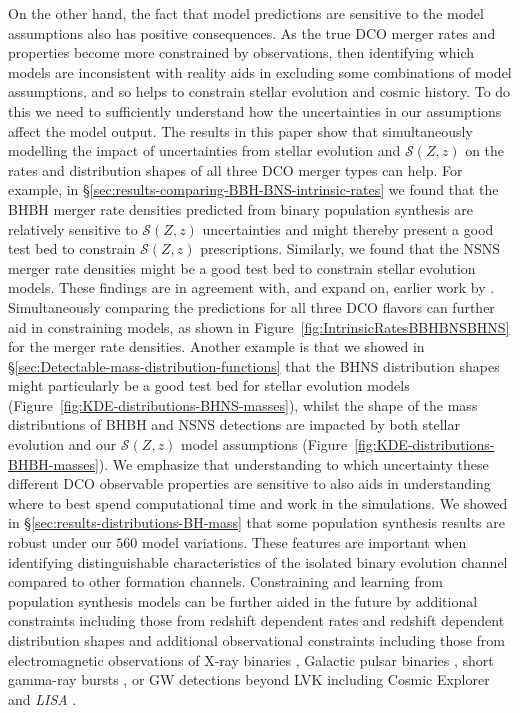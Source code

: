 \documentclass[fleqn,usenatbib]{mnras}
\newcommand{\SFRD}{\ensuremath{\mathcal{S}(Z,z)}\xspace}
\newcommand{\Nmodels}{\ensuremath{560}\xspace}
\begin{document}
On the other hand, the fact that model predictions are sensitive to the model assumptions also has positive consequences. As the true \ac{DCO} merger rates and properties become more constrained by observations, then identifying which models are inconsistent with reality aids in excluding some combinations of model assumptions, and so helps to constrain stellar evolution and cosmic history. To do this we need to sufficiently understand how the uncertainties in our assumptions affect the model output.  
The results in this paper show that simultaneously modelling the impact of uncertainties from stellar evolution and \SFRD on the rates and distribution shapes of all three \ac{DCO} merger types can help.  For example, in \S\ref{sec:results-comparing-BBH-BNS-intrinsic-rates} we found that the \ac{BHBH} merger rate densities predicted from binary population synthesis are relatively sensitive to \SFRD uncertainties and might thereby present a good test bed to constrain \SFRD prescriptions. Similarly, we found that the \ac{NSNS} merger rate densities might be a good test bed to constrain stellar evolution models. These findings are in agreement with, and expand on, earlier work by \citet{Chruslinska:2019dco,Neijssel:2019,Tang:2020,Santoliquido:2021}. Simultaneously comparing the predictions for all three \ac{DCO} flavors can further aid in constraining models, as shown in Figure~\ref{fig:IntrinsicRatesBBHBNSBHNS} for the merger rate densities. 
Another example is that we showed in \S\ref{sec:Detectable-mass-distribution-functions} that the \ac{BHNS} distribution shapes might particularly be a good test bed for stellar evolution models (Figure~\ref{fig:KDE-distributions-BHNS-masses}), whilst the shape of the mass distributions of \ac{BHBH} and \ac{NSNS}  detections are impacted by both stellar evolution and our \SFRD model assumptions (Figure~\ref{fig:KDE-distributions-BHBH-masses}). 
We emphasize that understanding to which uncertainty these different \ac{DCO} observable properties are sensitive to also aids in understanding where to best spend computational time and work in the simulations.    
We showed in \S\ref{sec:results-distributions-BH-mass} that some population synthesis results are robust under our \Nmodels model variations. 
These features are important when identifying distinguishable characteristics of the isolated binary evolution channel compared to other formation channels. 
Constraining and learning from population synthesis models can be further aided in the future by additional constraints including those from redshift dependent rates and redshift dependent distribution shapes \citep[cf.][]{Briel:2021,Chu:2021,Santoliquido:2021} and additional observational constraints including those from electromagnetic observations of  X-ray binaries \citep[e.g.,][]{Belczynski:2020bigBHpaper,Vinciguerra:2020}, Galactic pulsar binaries \citep[e.g.][]{Kruckow:2018,VignaGomez:2018,Chattopadhyay:2020bns,Chattopadhyay:2021bhns}, short gamma-ray bursts \citep[e.g.][]{Mandhai:2021,Zevin:2020sGRBoffset}, or \ac{GW} detections beyond LVK including Cosmic Explorer and \emph{LISA} \citep[e.g.][]{ShaoLi:2018,Ng:2021,Wagg:2021}. 
\end{document}
